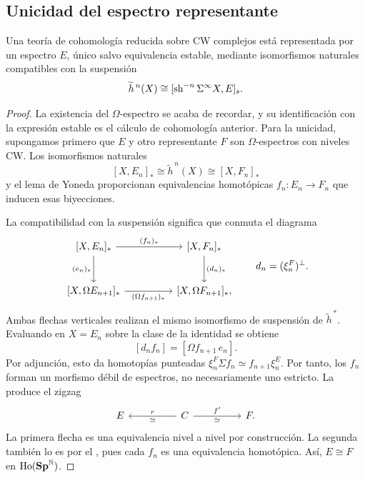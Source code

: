 \subsection{Unicidad del espectro representante}
\begin{teo}\label{teo:c19-unicidad-cohomologia}
Una teoría de cohomología reducida sobre CW complejos está representada por un espectro $E$, único salvo equivalencia estable, mediante isomorfismos naturales compatibles con la suspensión
\[
\widetilde h^{\,n}(X)\cong[\operatorname{sh}^{-n}\Sigma^\infty X,E]_s.
\]
\end{teo}
\begin{proof}
La existencia del $\Omega$-espectro se acaba de recordar, y su identificación con la expresión estable es el cálculo de cohomología anterior. Para la unicidad, supongamos primero que $E$ y otro representante $F$ son $\Omega$-espectros con niveles CW. Los isomorfismos naturales
\[
[X,E_n]_*\cong\widetilde h^{\,n}(X)\cong[X,F_n]_*
\]
y el lema de Yoneda proporcionan equivalencias homotópicas $f_n\colon E_n\to F_n$ que inducen esas biyecciones.

La compatibilidad con la suspensión significa que conmuta el diagrama
\[
\begin{tikzcd}[column sep=huge,row sep=large]
{[X,E_n]_*}\arrow[r,"(f_n)_*"]\arrow[d,"(e_n)_*"']
&{[X,F_n]_*}\arrow[d,"(d_n)_*"]\\
{[X,\Omega E_{n+1}]_*}\arrow[r,"(\Omega f_{n+1})_*"']
&{[X,\Omega F_{n+1}]_*},
\end{tikzcd}
\qquad d_n=(\xi^F_n)^\perp.
\]
Ambas flechas verticales realizan el mismo isomorfismo de suspensión de $\widetilde h^{\,*}$. Evaluando en $X=E_n$ sobre la clase de la identidad se obtiene
\[
[d_nf_n]=[\Omega f_{n+1}\,e_n].
\]
Por adjunción, esto da homotopías punteadas
$\xi^F_n\Sigma f_n\simeq f_{n+1}\xi^E_n$. Por tanto, los $f_n$ forman un morfismo débil de espectros, no necesariamente uno estricto. La  produce el zigzag
\[
\begin{tikzcd}[column sep=huge]
E&C\arrow[l,"r"',"\simeq"]\arrow[r,"f'","\simeq"']&F.
\end{tikzcd}
\]
La primera flecha es una equivalencia nivel a nivel por construcción. La segunda también lo es por el , pues cada $f_n$ es una equivalencia homotópica. Así, $E\cong F$ en $\operatorname{Ho}(\mathbf{Sp}^{\mathbb N})$.


\end{proof}
